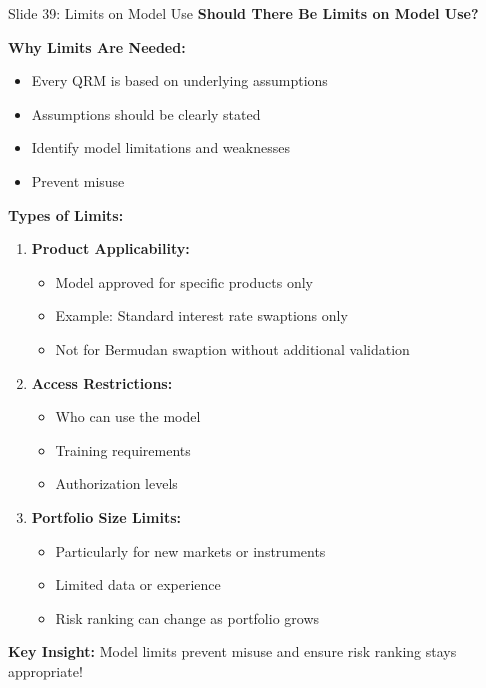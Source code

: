 \documentclass[8pt]{beamer}
\begin{document}
	\begin{frame}{Slide 39: Limits on Model Use}
		\fontsize{6.5}{7.5}\selectfont
		\textbf{Should There Be Limits on Model Use?}
		
		\vspace{0.1cm}
		\textbf{Why Limits Are Needed:}
		\begin{itemize}
			\item Every QRM is based on underlying assumptions
			\item Assumptions should be clearly stated
			\item Identify model limitations and weaknesses
			\item Prevent misuse
		\end{itemize}
		
		\vspace{0.1cm}
		\textbf{Types of Limits:}
		\begin{enumerate}
			\item \textbf{Product Applicability:}
			\begin{itemize}
				\item Model approved for specific products only
				\item Example: Standard interest rate swaptions only
				\item Not for Bermudan swaption without additional validation
			\end{itemize}
			\item \textbf{Access Restrictions:}
			\begin{itemize}
				\item Who can use the model
				\item Training requirements
				\item Authorization levels
			\end{itemize}
			\item \textbf{Portfolio Size Limits:}
			\begin{itemize}
				\item Particularly for new markets or instruments
				\item Limited data or experience
				\item Risk ranking can change as portfolio grows
			\end{itemize}
		\end{enumerate}
		
		\textcolor{myblue}{\textbf{Key Insight:}} Model limits prevent \textcolor{myblue}{misuse and ensure risk ranking stays appropriate}!
	\end{frame}
	
\end{document}
